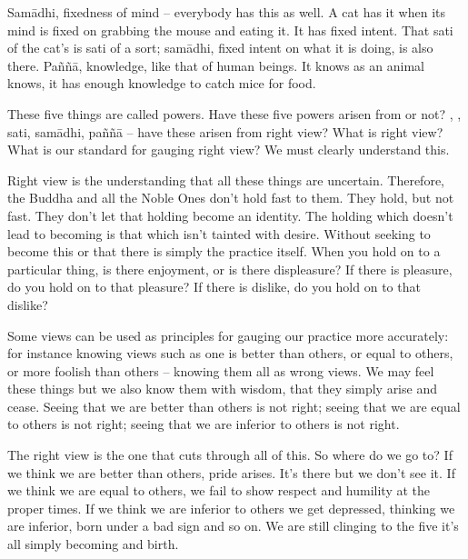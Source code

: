 Sam\=adhi, fixedness of mind -- everybody has this as well. A cat has it when its mind is fixed on grabbing the mouse and eating it. It has fixed intent. That sati of the cat's is sati of a sort; sam\=adhi, fixed intent on what it is doing, is also there. Pa\~n\~n\=a, knowledge, like that of human beings. It knows as an animal knows, it has enough knowledge to catch mice for food.

These five things are called powers. Have these five powers arisen from  or not? , , sati, sam\=adhi, pa\~n\~n\=a -- have these arisen from right view? What is right view? What is our standard for gauging right view? We must clearly understand this.

Right view is the understanding that all these things are uncertain. Therefore, the Buddha and all the Noble Ones don't hold fast to them. They hold, but not fast. They don't let that holding become an identity. The holding which doesn't lead to becoming is that which isn't tainted with desire. Without seeking to become this or that there is simply the practice itself. When you hold on to a particular thing, is there enjoyment, or is there displeasure? If there is pleasure, do you hold on to that pleasure? If there is dislike, do you hold on to that dislike?

Some views can be used as principles for gauging our practice more accurately: for instance knowing views such as one is better than others, or equal to others, or more foolish than others -- knowing them all as wrong views. We may feel these things but we also know them with wisdom, that they simply arise and cease. Seeing that we are better than others is not right; seeing that we are equal to others is not right; seeing that we are inferior to others is not right.

The right view is the one that cuts through all of this. So where do we go to? If we think we are better than others, pride arises.
It's there but we don't see it. If we think we are equal to others, we fail to show respect and humility at the proper times. If we think we are inferior to others we get depressed, thinking we are inferior, born under a bad sign and so on. We are still clinging to the five  it's all simply becoming and birth.


